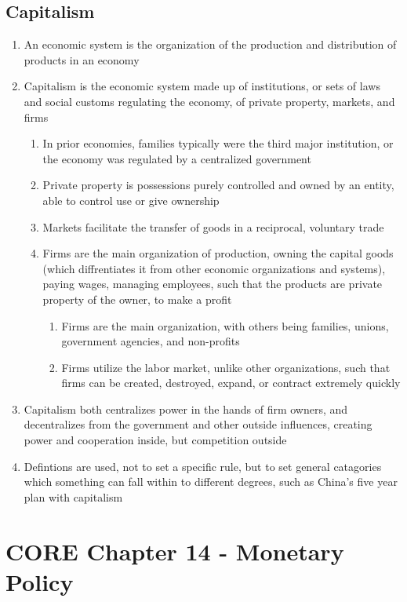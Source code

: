 \documentclass[11 pt, twoside]{article}
\begin{document}
\subsection{Capitalism}
\begin{enumerate}
\item An economic system is the organization of the production and distribution of products in an economy
\item Capitalism is the economic system made up of institutions, or sets of laws and social customs regulating the economy, of private property, markets, and firms
\begin{enumerate}
\item In prior economies, families typically were the third major institution, or the economy was regulated by a centralized government
\item Private property is possessions purely controlled and owned by an entity, able to control use or give ownership
\item Markets facilitate the transfer of goods in a reciprocal, voluntary trade
\item Firms are the main organization of production, owning the capital goods (which diffrentiates it from other economic organizations and systems), paying wages, managing employees, such that the products are private property of the owner, to make a profit
\begin{enumerate}
\item Firms are the main organization, with others being families, unions, government agencies, and non-profits
\item Firms utilize the labor market, unlike other organizations, such that firms can be created, destroyed, expand, or contract extremely quickly
\end{enumerate} 
\end{enumerate}
\item Capitalism both centralizes power in the hands of firm owners, and decentralizes from the government and other outside influences, creating power and cooperation inside, but competition outside
\item Defintions are used, not to set a specific rule, but to set general catagories which something can fall within to different degrees, such as China's five year plan with capitalism
\end{enumerate}


\section{CORE Chapter 14 - Monetary Policy}
\end{document}
